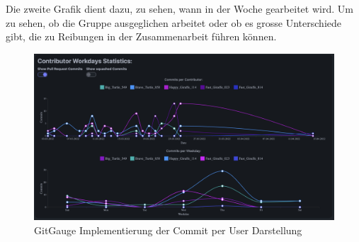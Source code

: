 Die zweite Grafik dient dazu, zu sehen, wann in der Woche gearbeitet wird. Um zu sehen, ob die Gruppe ausgeglichen arbeitet oder ob es grosse Unterschiede gibt, die zu Reibungen in der Zusammenarbeit führen können.
\begin{figure}[htbp]
\includegraphics[width=\textwidth]{Figures/gitgauge_commits.png}
\caption{GitGauge Implementierung der Commit per User Darstellung }
\label{fig:gitgauge_commits}
\end{figure}
